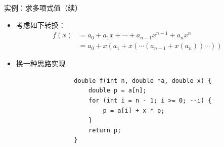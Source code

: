 \begin{fragile}
	\frametitle{\insertsubsectionhead}
	\begin{exampleblock}{实例：求多项式值（续）}
		\begin{itemize}
			\item 考虑如下转换：
			      \begin{align*}
				      f(x) & = a_{0} + a_{1}x + \cdots + a_{n-1}x^{n-1} + a_{n}x^{n}  \\
				           & = a_{0} + x(a_{1} + x(\cdots(a_{n-1} + x(a_{n}))\cdots))
			      \end{align*}
			\item<2-> 换一种思路实现
			      \begin{verbatim}
                double f(int n, double *a, double x) {
                    double p = a[n];
                    for (int i = n - 1; i >= 0; --i) {
                        p = a[i] + x * p;
                    }
                    return p;
                }
            \end{verbatim}
		\end{itemize}
	\end{exampleblock}
\end{fragile}

